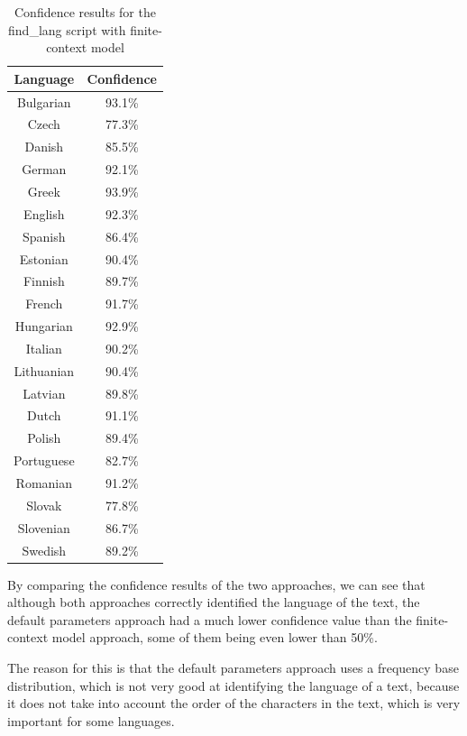 \documentclass{article}
\begin{document}
\begin{table}[H]
    \centering
    \begin{tabular}{|c|c|}
        \hline
        Language & Confidence \\
        \hline
        Bulgarian & 93.1\% \\
        Czech & 77.3\% \\
        Danish & 85.5\% \\
        German & 92.1\% \\
        Greek & 93.9\% \\
        English & 92.3\% \\
        Spanish & 86.4\% \\
        Estonian & 90.4\% \\
        Finnish & 89.7\% \\
        French & 91.7\% \\
        Hungarian & 92.9\% \\
        Italian & 90.2\% \\
        Lithuanian & 90.4\% \\
        Latvian & 89.8\% \\
        Dutch & 91.1\% \\
        Polish & 89.4\% \\
        Portuguese & 82.7\% \\
        Romanian & 91.2\% \\
        Slovak & 77.8\% \\
        Slovenian & 86.7\% \\
        Swedish & 89.2\% \\
        \hline
    \end{tabular}
    \caption{Confidence results for the find_lang script with finite-context model}
    \label{tab:find_lang_finite_context_confidence}
\end{table}

By comparing the confidence results of the two approaches, we can see that although both approaches correctly identified the language of the text,
the default parameters approach had a much lower confidence value than the finite-context model approach, some of them being even lower than 50\%.

The reason for this is that the default parameters approach uses a frequency base distribution, which is not very good at identifying the language of a text,
because it does not take into account the order of the characters in the text, which is very important for some languages.
\end{document}
